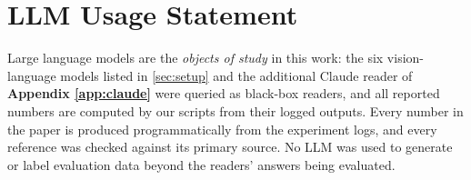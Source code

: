 \section*{LLM Usage Statement}
Large language models are the \emph{objects of study} in this work: the six vision-language models listed in \cref{sec:setup} and the additional Claude reader of \textbf{Appendix \ref{app:claude}} were queried as black-box readers, and all reported numbers are computed by our scripts from their logged outputs.
Every number in the paper is produced programmatically from the experiment logs, and every reference was checked against its primary source.
No LLM was used to generate or label evaluation data beyond the readers' answers being evaluated.
